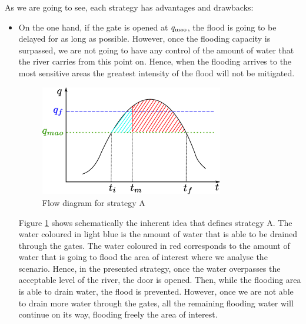 As we are going to see, each strategy has advantages and drawbacks: 
\begin{itemize}
\item On the one hand, if the gate is opened at $q_{\mbox{\scriptsize mao}}$, the flood is going to be delayed for as long as possible. However, once the flooding capacity is surpassed, we are not going to have any control of the amount of water that the river carries from this point on. Hence, when the flooding arrives to the most sensitive areas the greatest intensity of the  flood will not be mitigated.
\begin{figure}\centering
\includegraphics[width=8cm]{basicA}
\caption{Flow diagram for strategy A}
\label{fig:A}
\end{figure} 
Figure \ref{fig:A} shows schematically the inherent idea that defines strategy A. The water coloured in light blue is the amount of water that is able to be drained through the gates. The water coloured in red corresponds to the amount of water that is going to flood the area of interest where we analyse the scenario. Hence, in the presented strategy, once the water overpasses the acceptable level of the river, the door is opened. Then, while the flooding area is able to drain water, the flood is prevented. However, once we are not able to drain more water through the gates, all the remaining flooding water will continue on its way, flooding freely the area of interest.


\end{itemize}
